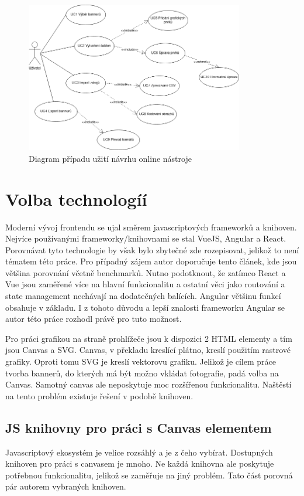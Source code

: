     \begin{figure}
        \centering
        \label{fig:use-case-diagram}
        \includegraphics[width=0.85\textwidth]{Figures/use-case.png}
        \caption[Use case diagram]{Diagram případu užití návrhu online nástroje}
    \end{figure}

    \section{Volba technologíí}
    Moderní vývoj frontendu se ujal směrem javascriptových frameworků a knihoven. Nejvíce používanými frameworky/knihovnami se stal VueJS, Angular a React.
    Porovnávat tyto technologie by však bylo zbytečné zde rozepisovat, jelikož to není tématem této práce.
    Pro případný zájem autor doporučuje tento článek, kde jsou většina porovnání včetně benchmarků.
    Nutno podotknout, že zatímco React a Vue jsou zaměřené více na hlavní funkcionalitu a ostatní věci jako routování a state management nechávají
    na dodatečných balících. Angular většinu funkcí obsahuje v základu.
    I z tohoto důvodu a lepší znalosti frameworku Angular se autor této práce rozhodl právě pro tuto možnost. 

    Pro práci grafikou na straně prohlížeče jsou k dispozici 2 HTML elementy a tím jsou Canvas a SVG.
    Canvas, v překladu kreslící plátno, kreslí použitím rastrové grafiky. Oproti tomu SVG je kreslí vektorovu grafiku.
    Jelikož je cílem práce tvorba bannerů, do kterých má být možno vkládat fotografie, padá volba na Canvas.
    Samotný canvas ale neposkytuje moc rozšířenou funkcionalitu. Naštěstí na tento problém existuje řešení v podobě knihoven.

        \subsection{JS knihovny pro práci s Canvas elementem}
        Javascriptový ekosystém je velice rozsáhlý a je z čeho vybírat. Dostupných knihoven pro práci s canvasem je mnoho.
        Ne každá knihovna ale poskytuje potřebnou funkcionalitu,
        jelikož se zaměřuje na jiný problém. Tato část porovná pár autorem vybraných knihoven.

